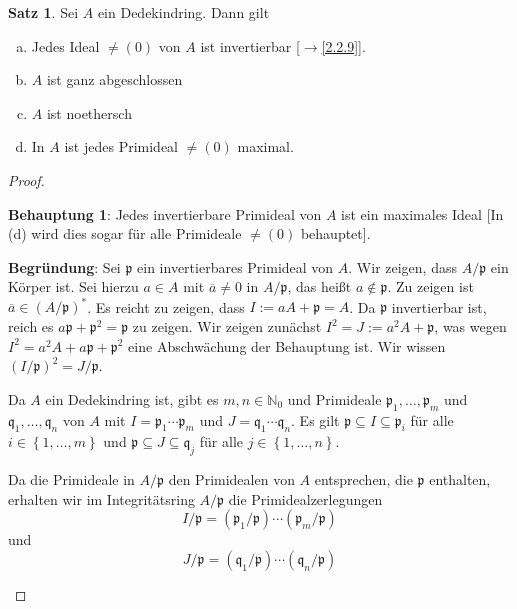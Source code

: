 \documentclass[
twoside=semi,
fontsize=12,
DIV=12, 
cleardoublepage=current,
leqno,
headings=optiontoheadandtoc, 
toc=idx
]{scrbook}
\newcommand{\N}{\mathbb{N}}
\newcommand{\set}[1]{\left\{ #1 \right\}}
\theoremstyle{definition}
\newtheorem{satz}[definition]{Satz}
\begin{document}
 	\begin{satz}\label{2.2.12}\hfill\newline
 		Sei $A$ ein Dedekindring. Dann gilt 
 		\begin{enumerate}[(a)]
 			\item Jedes Ideal $\neq (0)$ von $A$ ist invertierbar [$\to$\ref{2.2.9}].
 			\item $A$ ist ganz abgeschlossen
 			\item $A$ ist noethersch
 			\item In $A$ ist jedes Primideal $\neq (0)$ maximal.
 		\end{enumerate}
 	
 		\begin{proof}\hfill\newline
 			\begin{tcolorbox}[colback=white,colframe=blue,arc=0cm]
	 			\textbf{Behauptung 1}: Jedes invertierbare Primideal von $A$ ist ein maximales Ideal [In (d) wird dies sogar f\"ur alle Primideale $\neq (0)$ behauptet].
	 			
	 			\tcblower
	 			\textbf{Begr\"undung}: Sei $\mathfrak{p}$ ein invertierbares Primideal von $A$. Wir zeigen, dass $A/\mathfrak{p}$ ein K\"orper ist. Sei hierzu $a \in A$ mit $\overline{a} \neq 0$ in $A/\mathfrak{p}$, das hei\ss t $a \notin \mathfrak{p}$. Zu zeigen ist $\overline{a} \in (A/\mathfrak{p})^*$. Es reicht zu zeigen, dass $I:= aA + \mathfrak{p} = A$. Da $\mathfrak{p}$ invertierbar ist, reich es $a\mathfrak{p} + \mathfrak{p}^2 = \mathfrak{p}$ zu zeigen. Wir zeigen zun\"achst $I^2 = J:= a^2A + \mathfrak{p}$, was wegen $I^2 = a^2A + a\mathfrak{p} + \mathfrak{p}^2$ eine Abschw\"achung der Behauptung ist. Wir wissen $(I/\mathfrak{p})^2 = J/\mathfrak{p}$.
	 			
	 			Da $A$ ein Dedekindring ist, gibt es $m,n \in \N_0$ und Primideale $\mathfrak{p}_1,\dots, \mathfrak{p}_m$ und $\mathfrak{q}_1,\dots, \mathfrak{q}_n$ von $A$ mit $I = \mathfrak{p}_1 \cdots \mathfrak{p}_m$ und $J = \mathfrak{q}_1 \cdots \mathfrak{q}_n$. Es gilt $\mathfrak{p} \subseteq I \subseteq \mathfrak{p}_i$ f\"ur alle $i \in \set{1,\dots, m}$ und $\mathfrak{p} \subseteq J \subseteq \mathfrak{q}_j$ f\"ur alle $j \in\set{1,\dots,n}$. 
	 			
	 			Da die Primideale in $A/\mathfrak{p}$ den Primidealen von $A$ entsprechen, die $\mathfrak{p}$ enthalten, erhalten wir im Integrit\"atsring $A/\mathfrak{p}$ die Primidealzerlegungen
	 				\[I/\mathfrak{p} = (\mathfrak{p}_1/\mathfrak{p}) \cdots (\mathfrak{p}_m/\mathfrak{p})\]
	 			und 
	 				\[J/\mathfrak{p} = (\mathfrak{q}_1/\mathfrak{p}) \cdots (\mathfrak{q}_n/\mathfrak{p})\]
	 			

\end{tcolorbox}
\end{proof}
\end{satz}
\end{document}
